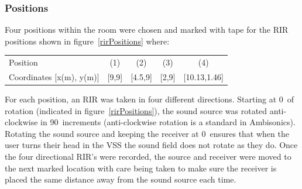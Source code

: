 \documentclass[../../main.tex]{subfiles}
\begin{document}
	\subsubsection{Positions}

		Four positions within the room were chosen and marked with tape for the \ac{RIR} positions shown in figure~\ref{rirPositions} where:

		\begin{center}
			\begin{tabular}{l| c c c c}
				Position & (1) & (2) & (3) & (4) \\
			Coordinates [x(m), y(m)] & [9,9] & [4.5,9] & [2,9] &  [10.13,1.46]\\
			\end{tabular}
		\end{center}

		\vspace{5mm}


		For each position, an \ac{RIR} was taken in four different directions. Starting at 0\textdegree~of rotation (indicated in figure~\ref{rirPositions}), the sound source was rotated anti-clockwise in 90\textdegree~increments (anti-clockwise rotation is a standard in Ambisonics). Rotating the sound source and keeping the receiver at 0\textdegree~ensures that when the user turns their head in the \ac{VSS} the sound field does not rotate as they do. Once the four directional \ac{RIR}'s were recorded, the source and receiver were moved to the next marked location with care being taken to make sure the receiver is placed the same distance away from the sound source each time.
\end{document}
